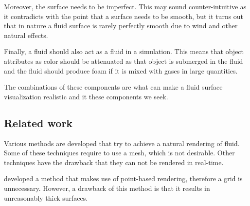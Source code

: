 Moreover, the surface needs to be imperfect. This may sound counter-intuitive as it contradicts with the point that a surface needs to be smooth, but it turns out that in nature a fluid surface is rarely perfectly smooth due to wind and other natural effects.

Finally, a fluid should also act as a fluid in a simulation. This means that object attributes as color should be attenuated as that object is submerged in the fluid and the fluid should produce foam if it is mixed with gases in large quantities. 

The combinations of these components are what can make a fluid surface visualization realistic and it these components we seek.
\subsection{Related work}
Various methods are developed that try to achieve a natural rendering of fluid.
Some of these techniques require to use a mesh, which is not desirable.
Other techniques have the drawback that they can not be rendered in real-time.

\cite{zhang2008adaptive} developed a method that makes use of point-based rendering, therefore a grid is unnecessary.
However, a drawback of this method is that it results in unreasonably thick surfaces.
